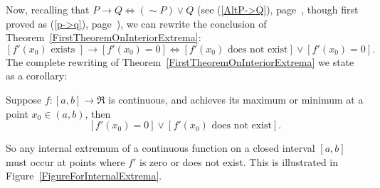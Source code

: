 Now, recalling that $P\longrightarrow Q\iff(\sim P)\vee Q$
(see (\ref{AltP->Q}), page~\pageref{AltP->Q}, though first proved as
(\ref{p->q}), page~\pageref{p->q}), we 
can rewrite the conclusion of Theorem~\ref{FirstTheoremOnInteriorExtrema}:
$$[f'(x_0)\text{ exists }] \longrightarrow [f'(x_0)=0]
      \iff [f'(x_0)\text{ does not exist}]\vee[f'(x_0)=0].$$
The complete rewriting of Theorem~\ref{FirstTheoremOnInteriorExtrema}
we state as a corollary:
\begin{corollary}
Suppose $f:[a,b]\longrightarrow\Re$ is continuous, and achieves its 
maximum or minimum at a point $x_0\in(a,b)$, then
$$[f'(x_0)=0]\vee[f'(x_0)\text{ does not exist}].$$
\label{Corollary1ForFirstTheoremOnInteriorExtrema}\end{corollary}
So any internal extremum of a continuous function on a closed interval
$[a,b]$ must occur at points where $f'$ is zero or does not exist.
This is illustrated in Figure~\ref{FigureForInternalExtrema}.

